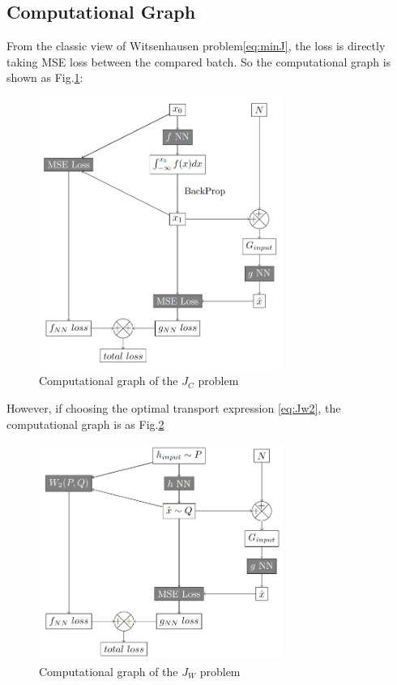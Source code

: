 \documentclass[conference,compsoc]{IEEEtran}
\begin{document}
\subsection{Computational Graph}
From the classic view of Witsenhausen problem\eqref{eq:minJ}, the loss is directly taking MSE loss between the compared batch. So the computational graph is shown as Fig.\ref{fig:classic comp graph}:
\begin{figure}[htp]
  \centering
  \includegraphics[width=8cm]{computational_graph/J_C.png}
  \caption{Computational graph of the $J_C$ problem}
  \label{fig:classic comp graph}
\end{figure}

However, if choosing the optimal transport expression \eqref{eq:Jw2}, the computational graph is as Fig.\ref{fig:Wasserstein comp graph}
\begin{figure}[htp]
  \centering
  \includegraphics[width=8cm]{computational_graph/J_W.png}
  \caption{Computational graph of the $J_W$ problem}
  \label{fig:Wasserstein comp graph}
\end{figure}
\end{document}
